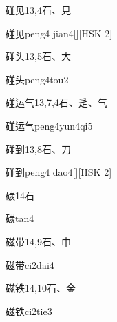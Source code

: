 \begin{entry}{碰见}{13,4}{⽯、⾒}
  \begin{phonetics}{碰见}{peng4 jian4}[][HSK 2]
  \end{phonetics}
\end{entry}

\begin{entry}{碰头}{13,5}{⽯、⼤}
  \begin{phonetics}{碰头}{peng4tou2}
  \end{phonetics}
\end{entry}

\begin{entry}{碰运气}{13,7,4}{⽯、⾡、⽓}
  \begin{phonetics}{碰运气}{peng4yun4qi5}
  \end{phonetics}
\end{entry}

\begin{entry}{碰到}{13,8}{⽯、⼑}
  \begin{phonetics}{碰到}{peng4 dao4}[][HSK 2]
  \end{phonetics}
\end{entry}

\begin{entry}{碳}{14}{⽯}
  \begin{phonetics}{碳}{tan4}
  \end{phonetics}
\end{entry}

\begin{entry}{磁带}{14,9}{⽯、⼱}
  \begin{phonetics}{磁带}{ci2dai4}
  \end{phonetics}
\end{entry}

\begin{entry}{磁铁}{14,10}{⽯、⾦}
  \begin{phonetics}{磁铁}{ci2tie3}
  \end{phonetics}
\end{entry}

